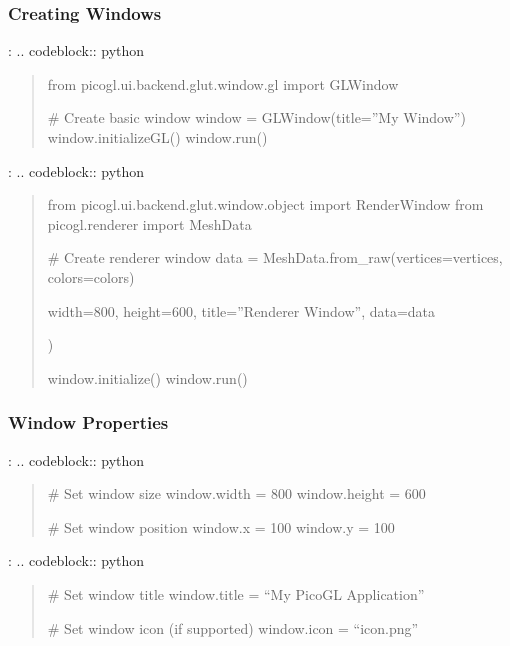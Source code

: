 \documentclass[a4paper,10pt,english,openany,oneside]{sphinxmanual}
\begin{document}
\subsubsection{Creating Windows}
\label{\detokenize{api/ui:creating-windows}}
\sphinxAtStartPar
{}:
.. code\sphinxhyphen{}block:: python
\begin{quote}

\sphinxAtStartPar
from picogl.ui.backend.glut.window.gl import GLWindow

\sphinxAtStartPar
\# Create basic window
window = GLWindow(title=”My Window”)
window.initializeGL()
window.run()
\end{quote}

\sphinxAtStartPar
{}:
.. code\sphinxhyphen{}block:: python
\begin{quote}

\sphinxAtStartPar
from picogl.ui.backend.glut.window.object import RenderWindow
from picogl.renderer import MeshData

\sphinxAtStartPar
\# Create renderer window
data = MeshData.from\_raw(vertices=vertices, colors=colors)
\begin{description}
\sphinxAtStartPar
width=800,
height=600,
title=”Renderer Window”,
data=data

\end{description}

\sphinxAtStartPar
)

\sphinxAtStartPar
window.initialize()
window.run()
\end{quote}


\subsubsection{Window Properties}
\label{\detokenize{api/ui:window-properties}}
\sphinxAtStartPar
{}:
.. code\sphinxhyphen{}block:: python
\begin{quote}

\sphinxAtStartPar
\# Set window size
window.width = 800
window.height = 600

\sphinxAtStartPar
\# Set window position
window.x = 100
window.y = 100
\end{quote}

\sphinxAtStartPar
{}:
.. code\sphinxhyphen{}block:: python
\begin{quote}

\sphinxAtStartPar
\# Set window title
window.title = “My PicoGL Application”

\sphinxAtStartPar
\# Set window icon (if supported)
window.icon = “icon.png”
\end{quote}
\end{document}
